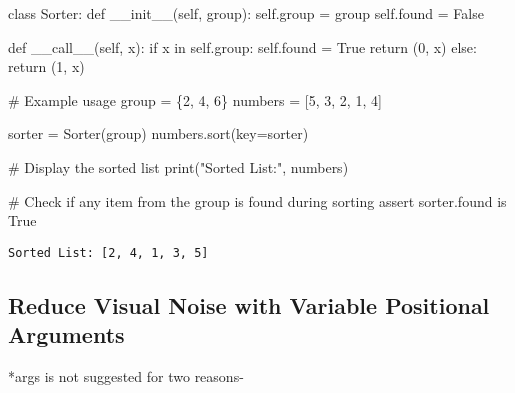 \documentclass[
]{report}
\newenvironment{Shaded}{\begin{snugshade}}{\end{snugshade}}
\newcommand{\BuiltInTok}[1]{\textcolor[rgb]{0.00,0.23,0.31}{#1}}
\newcommand{\CommentTok}[1]{\textcolor[rgb]{0.37,0.37,0.37}{#1}}
\newcommand{\ControlFlowTok}[1]{\textcolor[rgb]{0.00,0.23,0.31}{#1}}
\newcommand{\DecValTok}[1]{\textcolor[rgb]{0.68,0.00,0.00}{#1}}
\newcommand{\FunctionTok}[1]{\textcolor[rgb]{0.28,0.35,0.67}{#1}}
\newcommand{\KeywordTok}[1]{\textcolor[rgb]{0.00,0.23,0.31}{#1}}
\newcommand{\NormalTok}[1]{\textcolor[rgb]{0.00,0.23,0.31}{#1}}
\newcommand{\OperatorTok}[1]{\textcolor[rgb]{0.37,0.37,0.37}{#1}}
\newcommand{\StringTok}[1]{\textcolor[rgb]{0.13,0.47,0.30}{#1}}
\newcommand{\VariableTok}[1]{\textcolor[rgb]{0.07,0.07,0.07}{#1}}
\begin{document}
\begin{Shaded}
\begin{Highlighting}[]
\KeywordTok{class}\NormalTok{ Sorter:}
    \KeywordTok{def} \FunctionTok{\_\_init\_\_}\NormalTok{(}\VariableTok{self}\NormalTok{, group):}
        \VariableTok{self}\NormalTok{.group }\OperatorTok{=}\NormalTok{ group}
        \VariableTok{self}\NormalTok{.found }\OperatorTok{=} \VariableTok{False}

    \KeywordTok{def} \FunctionTok{\_\_call\_\_}\NormalTok{(}\VariableTok{self}\NormalTok{, x):}
        \ControlFlowTok{if}\NormalTok{ x }\KeywordTok{in} \VariableTok{self}\NormalTok{.group:}
            \VariableTok{self}\NormalTok{.found }\OperatorTok{=} \VariableTok{True}
            \ControlFlowTok{return}\NormalTok{ (}\DecValTok{0}\NormalTok{, x)}
        \ControlFlowTok{else}\NormalTok{:}
            \ControlFlowTok{return}\NormalTok{ (}\DecValTok{1}\NormalTok{, x)}

\CommentTok{\# Example usage}
\NormalTok{group }\OperatorTok{=}\NormalTok{ \{}\DecValTok{2}\NormalTok{, }\DecValTok{4}\NormalTok{, }\DecValTok{6}\NormalTok{\}}
\NormalTok{numbers }\OperatorTok{=}\NormalTok{ [}\DecValTok{5}\NormalTok{, }\DecValTok{3}\NormalTok{, }\DecValTok{2}\NormalTok{, }\DecValTok{1}\NormalTok{, }\DecValTok{4}\NormalTok{]}

\NormalTok{sorter }\OperatorTok{=}\NormalTok{ Sorter(group)}
\NormalTok{numbers.sort(key}\OperatorTok{=}\NormalTok{sorter)}

\CommentTok{\# Display the sorted list}
\BuiltInTok{print}\NormalTok{(}\StringTok{"Sorted List:"}\NormalTok{, numbers)}

\CommentTok{\# Check if any item from the group is found during sorting}
\ControlFlowTok{assert}\NormalTok{ sorter.found }\KeywordTok{is} \VariableTok{True}
\end{Highlighting}
\end{Shaded}

\begin{verbatim}
Sorted List: [2, 4, 1, 3, 5]
\end{verbatim}

\hypertarget{reduce-visual-noise-with-variable-positional-arguments}{%
\subsection{Reduce Visual Noise with Variable Positional
Arguments}\label{reduce-visual-noise-with-variable-positional-arguments}}

*args is not suggested for two reasons-
\end{document}
